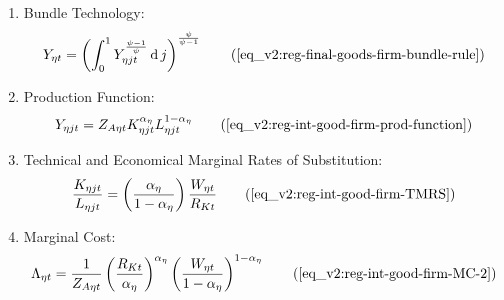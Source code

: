 \documentclass[../thesis.tex]{subfiles}
\begin{document}
{\begin{itemize}
\begin{enumerate}
\begin{comment}
		\end{comment}
		
		\item Bundle Technology:
		\begin{align}
			Y_{\eta t} = \left( \int_{0}^{1} Y_{\eta jt}^{\frac{\psi-1}{\psi}} \dif j \right)^{\frac{\psi}{\psi-1}} \tag{\ref{eq_v2:reg-final-goods-firm-bundle-rule}}
		\end{align}
		
		\item Production Function:
		\begin{align}
			Y_{\eta jt} = Z_{A\eta t} K_{\eta jt}^{\alpha_{\eta}} L_{\eta jt}^{1-{\alpha_{\eta}}} 
			\tag{\ref{eq_v2:reg-int-good-firm-prod-function}}
		\end{align}

		\item Technical and Economical Marginal Rates of Substitution:
		\begin{align}
			\frac{K_{\eta jt}}{L_{\eta jt}} = \left( \frac{{\alpha_{\eta}}}{1-\alpha_{\eta}} \right) \frac{W_{\eta t}}{R_{Kt}} \tag{\ref{eq_v2:reg-int-good-firm-TMRS}}
		\end{align}

\begin{comment}
	\item Capital Demand: 
	\begin{align}
		K_{\eta jt} & = \frac{Y_{\eta jt}}{Z_{A\eta t}} \left[ \left( \frac{{\alpha_{\eta}}}{1-\alpha_{\eta}} \right) \frac{W_{\eta t}}{R_{Kt}}\right]^{1-\alpha_{\eta}} \tag{\ref{eq_v2:reg-int-good-firm-Kt-demand}}
	\end{align}
	
	\item Labor Demand:
	\begin{align}
		L_{\eta jt} & = \frac{Y_{\eta jt}}{Z_{A\eta t}} \left[ \left( \frac{{\alpha_{\eta}}}{1-\alpha_{\eta}} \right) \frac{W_{\eta t}}{R_{Kt}}\right]^{-{\alpha_{\eta}}} \tag{\ref{eq_v2:reg-int-good-firm-Lt-demand}}
	\end{align}
\end{comment}

		\item Marginal Cost:
		\begin{align}
			\Lambda_{\eta t} = \frac{1}{Z_{A\eta t}} \left( \frac{R_{Kt}}{{\alpha_{\eta}}} \right)^{{\alpha_{\eta}}} \left( \frac{W_{\eta t}}{1-\alpha_{\eta}} \right)^{1-\alpha_{\eta}} \tag{\ref{eq_v2:reg-int-good-firm-MC-2}}
		\end{align}


\end{enumerate}
\end{itemize}}
\end{document}
